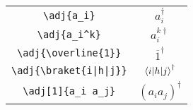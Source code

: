 \documentclass{jsarticle}
\begin{document}
%
\begin{table}[htpt]
\centering
\begin{tabular}{cc}
	\verb|\adj{a_i}| & $a_i^{\dagger}$ \\
	\verb|\adj{a_i^k}| & $a_i^{k\dagger}$ \\
	\verb|\adj{\overline{1}}| & ${\overline{1}}^{\dagger}$ \\
	\verb/\adj{\braket{i|h|j}}/ & $\braket{i|h|j}^{\dagger}$ \\
	\verb|\adj[1]{a_i a_j}| & $\left(a_i a_j\right)^{\dagger}$
\end{tabular}
\end{table}
\end{document}
